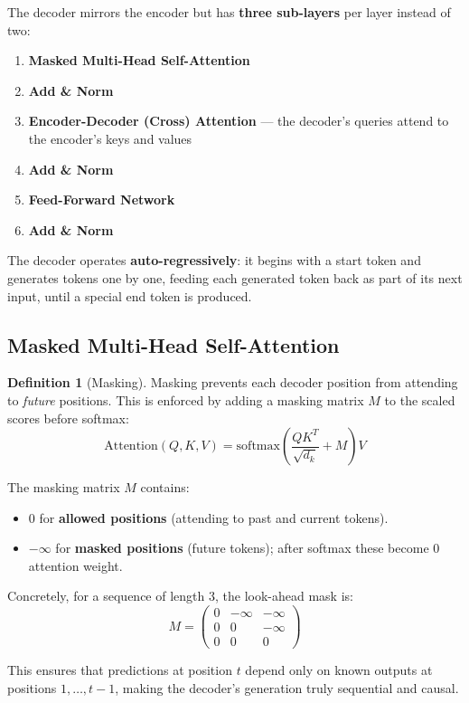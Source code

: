 \documentclass[11pt,a4paper]{article}
\theoremstyle{definition}
\newtheorem{definition}{Definition}[section]
\theoremstyle{plain}
\theoremstyle{remark}
\begin{document}
The decoder mirrors the encoder but has \textbf{three sub-layers} per layer instead of two:

\begin{enumerate}
    \item \textbf{Masked Multi-Head Self-Attention}
    \item \textbf{Add \& Norm}
    \item \textbf{Encoder-Decoder (Cross) Attention} --- the decoder's queries attend to the encoder's keys and values
    \item \textbf{Add \& Norm}
    \item \textbf{Feed-Forward Network}
    \item \textbf{Add \& Norm}
\end{enumerate}

The decoder operates \textbf{auto-regressively}: it begins with a start token and generates tokens one by one, feeding each generated token back as part of its next input, until a special end token is produced.

\subsection{Masked Multi-Head Self-Attention}

\begin{definition}[Masking]
Masking prevents each decoder position from attending to \emph{future} positions. This is enforced by adding a masking matrix $M$ to the scaled scores before softmax:
\[
    \mathrm{Attention}(Q, K, V) = \mathrm{softmax}\!\left(\frac{QK^T}{\sqrt{d_k}} + M\right) V
\]
\end{definition}

The masking matrix $M$ contains:
\begin{itemize}
    \item $0$ for \textbf{allowed positions} (attending to past and current tokens).
    \item $-\infty$ for \textbf{masked positions} (future tokens); after softmax these become 0 attention weight.
\end{itemize}

Concretely, for a sequence of length 3, the look-ahead mask is:
\[
M = \begin{pmatrix} 0 & -\infty & -\infty \\ 0 & 0 & -\infty \\ 0 & 0 & 0 \end{pmatrix}
\]

This ensures that predictions at position $t$ depend only on known outputs at positions $1, \ldots, t-1$, making the decoder's generation truly sequential and causal.
\end{document}
